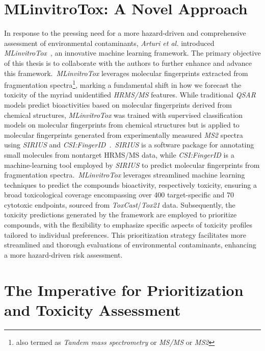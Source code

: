 \section{MLinvitroTox: A Novel Approach}

In response to the pressing need for a more hazard-driven and comprehensive assessment of environmental contaminants, \emph{Arturi et al.} introduced \emph{MLinvitroTox}~\cite{arturi}, an innovative machine learning framework.
The primary objective of this thesis is to collaborate with the authors to further enhance and advance this framework.~\emph{MLinvitroTox} leverages molecular fingerprints extracted from fragmentation spectra\footnote{also termed as \emph{Tandem mass spectrometry} or \emph{MS/MS} or \emph{MS2}}, marking a fundamental shift in how we forecast the toxicity of the myriad unidentified \emph{HRMS/MS} features. While traditional \emph{QSAR} models predict bioactivities based on molecular fingerprints derived from chemical structures, \emph{MLinvitroTox} was trained with supervised classification models on molecular fingerprints from chemical structures but is applied to molecular fingerprints generated from experimentally measured \emph{MS2} spectra using \emph{SIRIUS} and \emph{CSI:FingerID}~\cite{sirius2019}.~\emph{SIRIUS} is a software package for annotating small molecules from nontarget HRMS/MS data, while \emph{CSI:FingerID} is a machine-learning tool employed by \emph{SIRIUS} to predict molecular fingerprints from fragmentation spectra.~\emph{MLinvitroTox} leverages streamlined machine learning techniques to predict the compounds bioactivity, respectively toxicity, ensuring a broad toxicological coverage encompassing over 400 target-specific and 70 cytotoxic endpoints, sourced from \emph{ToxCast}/\emph{Tox21} data. Subsequently, the toxicity predictions generated by the framework are employed to prioritize compounds, with the flexibility to emphasize specific aspects of toxicity profiles tailored to individual preferences. This prioritization strategy facilitates more streamlined and thorough evaluations of environmental contaminants, enhancing a more hazard-driven risk assessment.

 \section{The Imperative for Prioritization and Toxicity Assessment}

